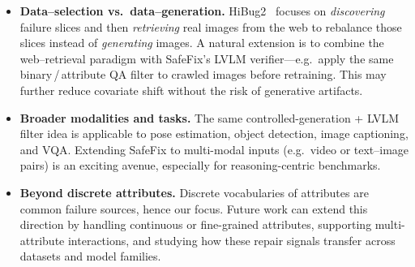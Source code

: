 \documentclass[10pt]{article} %
\newcommand{\model}{SafeFix\xspace}
\begin{document}
\begin{itemize}
  \item \textbf{Data–selection vs.\ data–generation.}  
        HiBug2~\citep{chen2025hibug2} focuses on \emph{discovering} failure slices and then
        \emph{retrieving} real images from the web to
        rebalance those slices instead of \emph{generating} images.  A natural extension is to combine the
        web–retrieval paradigm with SafeFix’s LVLM verifier—e.g.\ apply the
        same binary\,/\,attribute QA filter to crawled images before
        retraining. This may further reduce covariate shift without the
        risk of generative artifacts.




  \item \textbf{Broader modalities and tasks.}  
        The same controlled-generation + LVLM filter idea is applicable to
        pose estimation, object detection, image captioning, and VQA.
        Extending \model{} to multi-modal inputs (e.g.\ video or text–image
        pairs) is an exciting avenue, especially for reasoning-centric
        benchmarks.
        
    \item \textbf{Beyond discrete attributes.} Discrete vocabularies of attributes are common failure sources, hence our focus. Future work can extend this direction by handling continuous or fine-grained attributes, supporting multi-attribute interactions, and studying how these repair signals transfer across datasets and model families.
\end{itemize}
\end{document}
